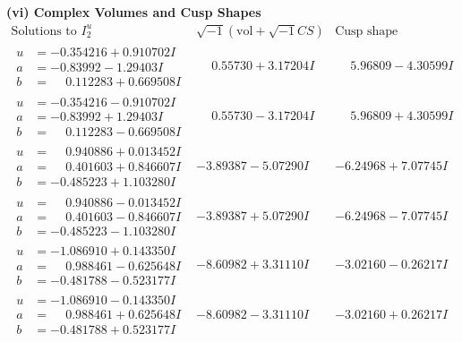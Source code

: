 \documentclass[1p]{elsarticle_modified}
\theoremstyle{definition}
\newcommand{\I}{\sqrt{-1}}
\begin{document}
\newpage\flushleft \textbf{(vi) Complex Volumes and Cusp Shapes}
$$\begin{array}{c|c|c}  
\text{Solutions to }I^u_{2}& \I (\text{vol} + \sqrt{-1}CS) & \text{Cusp shape}\\
 \hline 
\begin{aligned}
u &= -0.354216 + 0.910702 I \\
a &= -0.83992 - 1.29403 I \\
b &= \phantom{-}0.112283 + 0.669508 I\end{aligned}
 & \phantom{-}0.55730 + 3.17204 I & \phantom{-}5.96809 - 4.30599 I \\ \hline\begin{aligned}
u &= -0.354216 - 0.910702 I \\
a &= -0.83992 + 1.29403 I \\
b &= \phantom{-}0.112283 - 0.669508 I\end{aligned}
 & \phantom{-}0.55730 - 3.17204 I & \phantom{-}5.96809 + 4.30599 I \\ \hline\begin{aligned}
u &= \phantom{-}0.940886 + 0.013452 I \\
a &= \phantom{-}0.401603 + 0.846607 I \\
b &= -0.485223 + 1.103280 I\end{aligned}
 & -3.89387 - 5.07290 I & -6.24968 + 7.07745 I \\ \hline\begin{aligned}
u &= \phantom{-}0.940886 - 0.013452 I \\
a &= \phantom{-}0.401603 - 0.846607 I \\
b &= -0.485223 - 1.103280 I\end{aligned}
 & -3.89387 + 5.07290 I & -6.24968 - 7.07745 I \\ \hline\begin{aligned}
u &= -1.086910 + 0.143350 I \\
a &= \phantom{-}0.988461 - 0.625648 I \\
b &= -0.481788 - 0.523177 I\end{aligned}
 & -8.60982 + 3.31110 I & -3.02160 - 0.26217 I \\ \hline\begin{aligned}
u &= -1.086910 - 0.143350 I \\
a &= \phantom{-}0.988461 + 0.625648 I \\
b &= -0.481788 + 0.523177 I\end{aligned}
 & -8.60982 - 3.31110 I & -3.02160 + 0.26217 I \\ \hline\begin{aligned}

\end{aligned}
\end{array}$$
\end{document}
